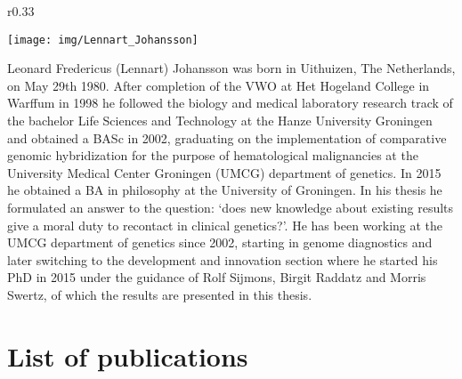 \begin{appendices}
	\begin{wrapfigure}{r}{0.33\textwidth}
		\begin{center}
			\texttt{[image: img/Lennart\_Johansson]}
		\end{center}
	\end{wrapfigure}
	Leonard Fredericus (Lennart) Johansson was born in Uithuizen, The Netherlands, on May 29th 1980. 
	After completion of the VWO at Het Hogeland College in Warffum in 1998 he followed the biology and medical laboratory research track of the bachelor Life Sciences and Technology at the Hanze University Groningen and obtained a BASc in 2002, graduating on the implementation of comparative genomic hybridization for the purpose of hematological malignancies at the University Medical Center Groningen (UMCG) department of genetics. 
	In 2015 he obtained a BA in philosophy at the University of Groningen. 
	In his thesis he formulated an answer to the question: ‘does new knowledge about existing results give a moral duty to recontact in clinical genetics?’. 
	He has been working at the UMCG department of genetics since 2002, starting in genome diagnostics and later switching to the development and innovation section where he started his PhD in 2015 under the guidance of Rolf Sijmons, Birgit Raddatz and Morris Swertz, of which the results are presented in this thesis.
	
	\chapter{List of publications}
	

\end{appendices}
